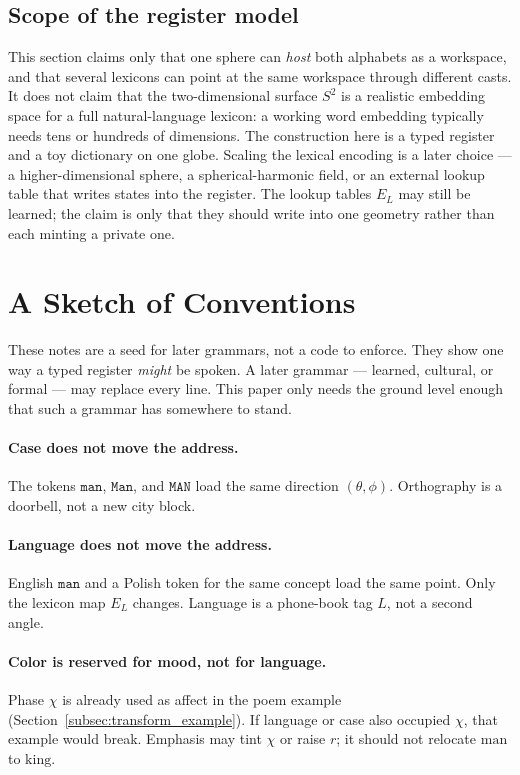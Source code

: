 \documentclass[12pt, a4paper]{article}
\begin{document}
\subsection{Scope of the register model}
\label{subsec:register_scope_final}
This section claims only that one sphere can \emph{host} both alphabets
as a workspace, and that several lexicons can point at the same
workspace through different casts. It does not claim that the two-dimensional surface
$S^2$ is a realistic embedding space for a full natural-language
lexicon: a working word embedding typically needs tens or hundreds of
dimensions. The construction here is a typed register and a toy
dictionary on one globe. Scaling the lexical encoding is a later
choice --- a higher-dimensional sphere, a spherical-harmonic field, or
an external lookup table that writes states into the register. The
lookup tables $E_L$ may still be learned; the claim is only that they
should write into one geometry rather than each minting a private one.

\section{A Sketch of Conventions}
\label{sec:conventions_sketch}
These notes are a seed for later grammars, not a code to enforce.
They show one way a typed register \emph{might} be spoken. A later
grammar --- learned, cultural, or formal --- may replace every line.
This paper only needs the ground level enough that such a grammar has
somewhere to stand.

\paragraph{Case does not move the address.}
The tokens $\texttt{man}$, $\texttt{Man}$, and $\texttt{MAN}$ load the
same direction $(\theta,\phi)$. Orthography is a doorbell, not a new
city block.

\paragraph{Language does not move the address.}
English $\texttt{man}$ and a Polish token for the same concept load the
same point. Only the lexicon map $E_L$ changes. Language is a
phone-book tag $L$, not a second angle.

\paragraph{Color is reserved for mood, not for language.}
Phase $\chi$ is already used as affect in the poem example
(Section~\ref{subsec:transform_example}). If language or case also
occupied $\chi$, that example would break. Emphasis may tint $\chi$
or raise $r$; it should not relocate $\mathrm{man}$ to $\mathrm{king}$.
\end{document}
